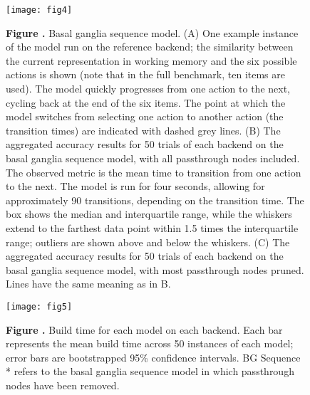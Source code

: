 \documentclass{frontiersSCNS}
\providecommand{\DIFaddbeginFL}{} %
\providecommand{\DIFaddendFL}{} %
\providecommand{\DIFdelbeginFL}{} %
\providecommand{\DIFdelendFL}{} %
\begin{document}
\begin{figure}[!ht]
\begin{center}
  \DIFdelbeginFL %
\DIFdelendFL \DIFaddbeginFL \texttt{[image: fig4]}
\DIFaddendFL \end{center}
\textbf{\label{fig:04} Figure .}
       {Basal ganglia sequence model. (A) One example instance
         of the model run on the reference backend; the similarity between
         the current representation in working memory and the six possible
         actions is shown (note that in the full benchmark, ten items are
         used). The model quickly progresses from one action to the next,
         cycling back at the end of the six items. The point at which the
         model switches from selecting one action to another action
         (the transition times) are indicated with dashed grey lines.
         (B) The aggregated accuracy results for 50 trials of
         each backend on the
         basal ganglia sequence model, with all passthrough nodes included.
         The observed metric is the mean
         time to transition from one action to the next. The model is run
         for four seconds, allowing for approximately 90 transitions, depending
         on the transition time. The box shows the median and
         interquartile range, while the whiskers extend to the farthest
         data point within 1.5 times the interquartile range;
         outliers are shown above and below the whiskers.
         (C) The aggregated accuracy results for 50 trials of
         each backend on the
         basal ganglia sequence model, with most passthrough nodes pruned.
         Lines have the same meaning as in B.}
\end{figure}

\begin{figure}[!ht]
\begin{center}
  \DIFdelbeginFL %
\DIFdelendFL \DIFaddbeginFL \texttt{[image: fig5]}
\DIFaddendFL \end{center}
\textbf{\label{fig:05} Figure .}
       {Build time for each model on each backend. Each bar represents
         the mean build time across 50 instances of each model;
         error bars are bootstrapped 95\% confidence intervals.
         BG Sequence * refers to the basal ganglia sequence model
         in which passthrough nodes have been removed.}
\end{figure}
\end{document}
